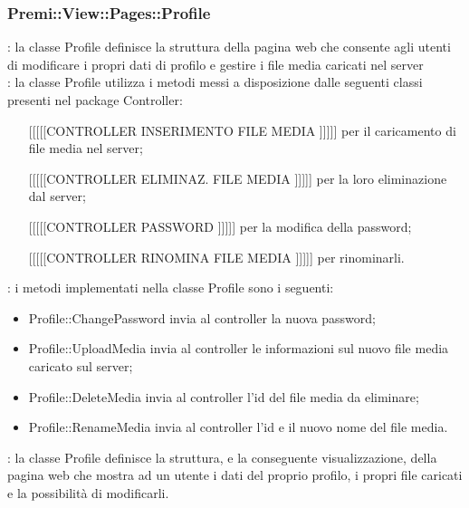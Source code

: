 {		\subsubsection{Premi::View::Pages::Profile}{
			\textbf{\tipo}: la classe Profile definisce la struttura della pagina web che consente agli utenti di modificare i propri dati di profilo e gestire i file media caricati nel server \\
			\textbf{\relaz}: la classe Profile utilizza i metodi messi a disposizione dalle seguenti classi presenti nel package Controller:
			\begin{itemize}
				\item [[[[[[CONTROLLER INSERIMENTO FILE MEDIA]]]]]] per il caricamento di file media nel server;
				\item [[[[[[CONTROLLER ELIMINAZ. FILE MEDIA]]]]]] per la loro eliminazione dal server;
				\item [[[[[[CONTROLLER PASSWORD]]]]]] per la modifica della password;
				\item [[[[[[CONTROLLER RINOMINA FILE MEDIA]]]]]] per rinominarli.
			\end{itemize}
			\textbf{\interfacce}: i metodi implementati nella classe Profile sono i seguenti:
			\begin{itemize}
				\item Profile::ChangePassword invia al controller la nuova password;
				\item Profile::UploadMedia invia al controller le informazioni sul nuovo file media caricato sul server;
				\item Profile::DeleteMedia invia al controller l'id del file media da eliminare;
				\item Profile::RenameMedia invia al controller l'id e il nuovo nome del file media.
			\end{itemize}
			\textbf{\attivita}: la classe Profile definisce la struttura, e la conseguente visualizzazione, della pagina web che mostra ad un utente i dati del proprio profilo, i propri file caricati e la possibilità di modificarli.\\
		}
}
